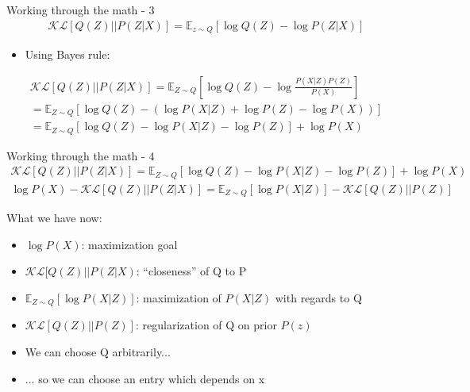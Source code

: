 \documentclass[10pt]{beamer}
\begin{document}
    \begin{frame}{Working through the math - 3}
    \begin{gather}
        \mathcal{KL}[Q(Z)||P(Z|X)] = \mathbb{E}_{z\sim Q}[\log Q(Z) - \log P(Z|X)]
    \end{gather}
    \pause
    \begin{itemize}
        \item Using Bayes rule:
    \end{itemize}
        \pause
    \begin{gather}
        \mathcal{KL}[Q(Z)||P(Z|X)] = \mathbb{E}_{Z\sim Q}[\log Q(Z) - \log \frac{P(X|Z) P(Z)}{P(X)}]\\
        = \mathbb{E}_{Z\sim Q}[\log Q(Z) - (\log P(X|Z) + \log P(Z) - \log P(X))]\\
        = \mathbb{E}_{Z\sim Q}[\log Q(Z) - \log P(X|Z) - \log P(Z)] + \log P(X)
    \end{gather}

\end{frame}

\begin{frame}{Working through the math - 4}
    \begin{gather}
        \mathcal{KL}[Q(Z)||P(Z|X)] = \mathbb{E}_{Z\sim Q}[\log Q(Z) - \log P(X|Z) - \log P(Z)] + \log P(X)\\
        \log P(X) - \mathcal{KL}[Q(Z)||P(Z|X)] = \mathbb{E}_{Z\sim Q}[\log P(X|Z)] - \mathcal{KL}[Q(Z)||P(Z)]
    \end{gather}
    \pause

    What we have now:
    \begin{itemize}[<+->]
        \item $\log P(X)$: maximization goal
        \item $\mathcal{KL}[Q(Z)||P(Z|X)$: ``closeness'' of Q to P
        \item $\mathbb{E}_{Z \sim Q}[\log P(X|Z)]$: maximization of $P(X|Z)$ with regards to Q
        \item $\mathcal{KL}[Q(Z)||P(Z)]$: regularization of Q on prior $P(z)$
    \end{itemize}

    \begin{itemize}[<+->]
        \item We can choose Q arbitrarily...
        \item ... so we can choose an entry which depends on x
    \end{itemize}

\end{frame}
\end{document}
